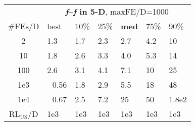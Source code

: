 \begin{tabular}{c|llllll}
 & \multicolumn{6}{|c}{\textbf{\textit{f}\raisebox{-0.35ex}{1}--\textit{f}\raisebox{-0.35ex}{24} in 5-D}, maxFE/D=1000}\\
\#FEs/D & best & 10\% & 25\% & \textbf{med} & 75\% & 90\%\\
2 & \hspace*{1ex}1.3 & \hspace*{1ex}1.7 & \hspace*{1ex}2.3 & \hspace*{1ex}2.7 & \hspace*{1ex}4.2 & 10\\
10 & \hspace*{1ex}1.8 & \hspace*{1ex}2.6 & \hspace*{1ex}3.3 & \hspace*{1ex}4.0 & \hspace*{1ex}5.3 & 14\\
100 & \hspace*{1ex}2.6 & \hspace*{1ex}3.1 & \hspace*{1ex}4.1 & \hspace*{1ex}7.1 & 10 & 25\\
1e3 & ~\,0.56 & \hspace*{1ex}1.8 & \hspace*{1ex}2.9 & \hspace*{1ex}5.5 & 18 & 48\\
1e4 & ~\,0.67 & \hspace*{1ex}2.5 & \hspace*{1ex}7.2 & 25 & 50 & 1.8e2\\
$\text{RL}_{\text{US}}$/D & 1e3 & 1e3 & 1e3 & 1e3 & 1e3 & 1e3
\end{tabular}
